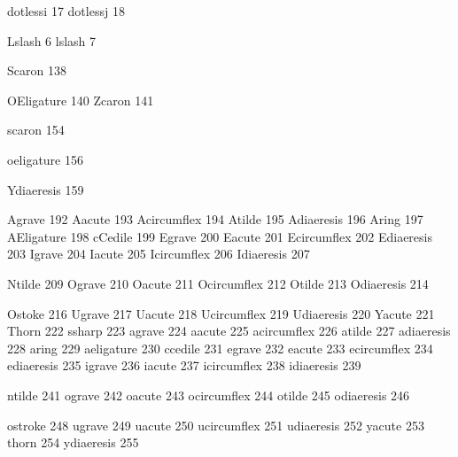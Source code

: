  dotlessi           17
 dotlessj           18

 Lslash              6
 lslash              7

 Scaron            138

 OEligature        140
 Zcaron            141

 scaron            154

 oeligature        156

 Ydiaeresis        159

 Agrave            192
 Aacute            193
 Acircumflex       194
 Atilde            195
 Adiaeresis        196      
 Aring             197
 AEligature        198
 cCedile           199
 Egrave            200
 Eacute            201
 Ecircumflex       202
 Ediaeresis        203
 Igrave            204
 Iacute            205
 Icircumflex       206
 Idiaeresis        207

 Ntilde            209
 Ograve            210
 Oacute            211
 Ocircumflex       212
 Otilde            213
 Odiaeresis        214

 Ostoke            216
 Ugrave            217
 Uacute            218
 Ucircumflex       219
 Udiaeresis        220
 Yacute            221
 Thorn             222
 ssharp            223
 agrave            224
 aacute            225
 acircumflex       226
 atilde            227
 adiaeresis        228      
 aring             229
 aeligature        230
 ccedile           231
 egrave            232
 eacute            233
 ecircumflex       234
 ediaeresis        235      
 igrave            236
 iacute            237
 icircumflex       238
 idiaeresis        239

 ntilde            241
 ograve            242
 oacute            243
 ocircumflex       244
 otilde            245
 odiaeresis        246

 ostroke           248
 ugrave            249
 uacute            250
 ucircumflex       251
 udiaeresis        252
 yacute            253
 thorn             254
 ydiaeresis        255
      
\stopencoding

\endinput 
